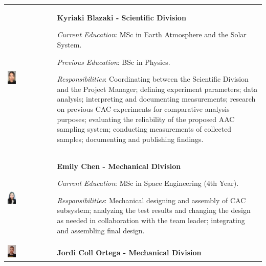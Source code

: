 \documentclass[a4paper,12pt,oneside]{article} %
\providecommand{\DIFaddtex}[1]{{\protect\color{blue}\uwave{#1}}} %
\providecommand{\DIFdeltex}[1]{{\protect\color{red}\sout{#1}}}                      %
\providecommand{\DIFaddbegin}{} %
\providecommand{\DIFaddend}{} %
\providecommand{\DIFdelbegin}{} %
\providecommand{\DIFdelend}{} %
\providecommand{\DIFadd}[1]{\texorpdfstring{\DIFaddtex{#1}}{#1}} %
\providecommand{\DIFdel}[1]{\texorpdfstring{\DIFdeltex{#1}}{}} %
\newcommand{\DIFscaledelfig}{0.5}
\newlength{\DIFdelgraphicswidth} %
\newlength{\DIFdelgraphicsheight} %
\newcommand{\DIFaddincludegraphics}[2][]{{\color{blue}\fbox{\DIFOincludegraphics[#1]{#2}}}} %
\newcommand{\DIFdelincludegraphics}[2][]{%
\sbox{\DIFdelgraphicsbox}{\DIFOincludegraphics[#1]{#2}}%
\settoboxwidth{\DIFdelgraphicswidth}{\DIFdelgraphicsbox} %
\settoboxtotalheight{\DIFdelgraphicsheight}{\DIFdelgraphicsbox} %
\scalebox{\DIFscaledelfig}{%
\parbox[b]{\DIFdelgraphicswidth}{\usebox{\DIFdelgraphicsbox}\\[-\baselineskip] \rule{\DIFdelgraphicswidth}{0em}}\llap{\resizebox{\DIFdelgraphicswidth}{\DIFdelgraphicsheight}{%
\setlength{\unitlength}{\DIFdelgraphicswidth}%
\begin{picture}(1,1)%
\thicklines\linethickness{2pt} %
{\color[rgb]{1,0,0}\put(0,0){\framebox(1,1){}}}%
{\color[rgb]{1,0,0}\put(0,0){\line( 1,1){1}}}%
{\color[rgb]{1,0,0}\put(0,1){\line(1,-1){1}}}%
\end{picture}%
}\hspace*{3pt}}} %
} %
\DeclareRobustCommand{\DIFaddbegin}{\DIFOaddbegin \let\includegraphics\DIFaddincludegraphics} %
\DeclareRobustCommand{\DIFaddend}{\DIFOaddend \let\includegraphics\DIFOincludegraphics} %
\DeclareRobustCommand{\DIFdelbegin}{\DIFOdelbegin \let\includegraphics\DIFdelincludegraphics} %
\DeclareRobustCommand{\DIFdelend}{\DIFOaddend \let\includegraphics\DIFOincludegraphics} %
\begin{document}
\begin{longtable}[]{m{} m{}}
\includegraphics[width=0.2\textwidth]{1-introduction/img/kiki-blazaki.jpg} & \textbf{Kyriaki Blazaki - Scientific Division}

\smallskip
\textit{Current Education}: MSc in Earth Atmosphere and the Solar System.

\smallskip
\textit{Previous Education}: BSc in Physics.


\smallskip
\textit{Responsibilities}: Coordinating between the Scientific Division and the Project Manager; defining experiment parameters; data analysis; interpreting and documenting measurements; research on previous CAC experiments for comparative analysis purposes; evaluating the reliability of the proposed AAC sampling system; conducting measurements of collected samples; documenting and publishing findings. 
\bigskip
\\

\includegraphics[width=0.2\textwidth]{1-introduction/img/emily-chen.jpeg} & \textbf{Emily Chen - Mechanical Division}

\smallskip
\textit{Current Education}: MSc in Space Engineering (\DIFdelbegin \DIFdel{4th }\DIFdelend \DIFaddbegin \DIFadd{5th }\DIFaddend Year).


\smallskip
\textit{Responsibilities}: Mechanical designing and assembly of CAC subsystem; analyzing the test results and changing the design as needed in collaboration with the team leader; integrating and assembling final design. 
\bigskip
\\

\includegraphics[width=0.2\textwidth]{1-introduction/img/jordi-coll-ortega.jpg} & \textbf{Jordi Coll Ortega - Mechanical Division}


\end{longtable}
\end{document}
